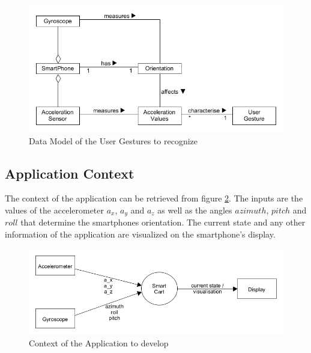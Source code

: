 \begin{figure}
\centering
\captionsetup{justification=centering}
\includegraphics[width=\textwidth]{res/sa/UserGestureDataModel.png}
\caption{Data Model of the User Gestures to recognize}
\label{fig:DataModel}
\end{figure}

\subsection{Application Context}
The context of the application can be retrieved from figure \ref{fig:context}.
The inputs are the values of the accelerometer $a_x$, $a_y$ and $a_z$ as well as
the angles $azimuth$, $pitch$ and $roll$ that determine the smartphones
orientation. The current state and any other information of the application are
visualized on the smartphone's display.

\begin{figure}
\centering
\captionsetup{justification=centering}
\includegraphics[width=\textwidth]{res/sa/ContextDiagram.png}
\caption{Context of the Application to develop}
\label{fig:context}
\end{figure}


